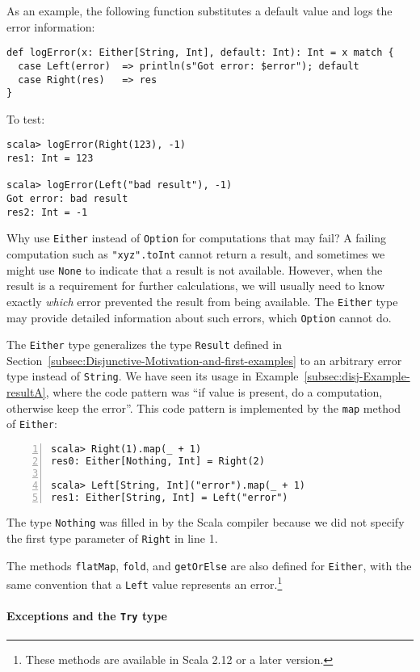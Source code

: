 As an example, the following function substitutes a default value
and logs the error information:
\begin{lstlisting}
def logError(x: Either[String, Int], default: Int): Int = x match {
  case Left(error)  => println(s"Got error: $error"); default
  case Right(res)   => res
}
\end{lstlisting}
To test:
\begin{lstlisting}
scala> logError(Right(123), -1)
res1: Int = 123

scala> logError(Left("bad result"), -1)
Got error: bad result
res2: Int = -1
\end{lstlisting}

Why use \lstinline!Either! instead of \lstinline!Option! for computations
that may fail? A failing computation such as \lstinline!"xyz".toInt!
cannot return a result, and sometimes we might use \lstinline!None!
to indicate that a result is not available. However, when the result
is a requirement for further calculations, we will usually need to
know exactly \emph{which} error prevented the result from being available.
The \lstinline!Either! type may provide detailed information about
such errors, which \lstinline!Option! cannot do. 

The \lstinline!Either! type generalizes the type \lstinline!Result!
defined in Section~\ref{subsec:Disjunctive-Motivation-and-first-examples}
to an arbitrary error type instead of \lstinline!String!. We have
seen its usage in Example~\ref{subsec:disj-Example-resultA}, where
the code pattern was ``if value is present, do a computation, otherwise
keep the error''. This code pattern is implemented by the \lstinline!map!
method of \lstinline!Either!:
\begin{lstlisting}[numbers=left]
scala> Right(1).map(_ + 1)
res0: Either[Nothing, Int] = Right(2)

scala> Left[String, Int]("error").map(_ + 1)
res1: Either[String, Int] = Left("error")
\end{lstlisting}
The type \lstinline!Nothing! was filled in by the Scala compiler
because we did not specify the first type parameter of \lstinline!Right!
in line 1.

The methods \lstinline!flatMap!, \lstinline!fold!, and \lstinline!getOrElse!
are also defined for \lstinline!Either!, with the same convention
that a \lstinline!Left! value represents an error.\footnote{These methods are available in Scala 2.12 or a later version.}

\paragraph{Exceptions and the \texttt{Try} type}

